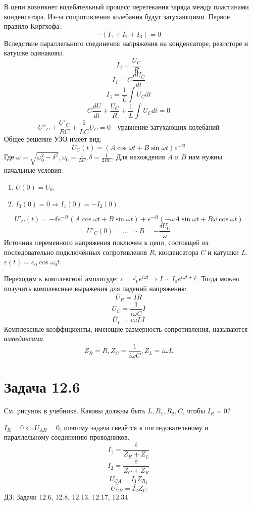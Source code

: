 \documentclass[11pt]{article}
\begin{document}
В цепи возникнет колебательный процесс перетекания заряда между пластинами конденсатора. Из-за сопротивления
колебания будут затухающими.
Первое правило Киргхофа:
$$-(I_1 + I_2 + I_3) = 0$$
Вследствие параллельного соединения напряжения на конденсаторе, резисторе и катушке одинаковы.
$$I_2 = \frac{U_C}R$$
$$I_1 = C\frac{dU_C}{dt}$$
$$I_3 = \frac{1}L\int U_Cdt$$
$$C\frac{dU}{dt} + \frac{U_C}R + \frac{1}L\int U_Cdt = 0$$
$$U''_C + \frac{U'_C}{RC} + \frac{1}{LC}U_C = 0 \text{ - уравнение затухающих колебаний}$$
Общее решение УЗО имеет вид:
$$U_C(t) = (A\cos \omega t + B\sin \omega t)e^{-\delta t}$$
Где \(\omega = \sqrt{\omega_0^2 - \delta^2}, \omega_0 = \frac{1}{LC}, \delta = \frac{1}{2RC}\).
Для нахождения \(A\) и \(B\) нам нужны начальные условия:
\begin{enumerate}
\item \(U(0) = U_0\).
\item \(I_3(0) = 0 \Rightarrow I_1(0) = -I_2(0)\).
\end{enumerate}
$$U'_C(t) = -\delta e^{-\delta t}(A\cos\omega t + B\sin\omega t) + e^{-\delta t}(-\omega A\sin\omega t + B\omega\cos\omega t)$$
$$U'_C(0) = \ldots \Rightarrow B = -\frac{\delta U_0}\omega$$
Источник переменного напряжения поключен к цепи, состоящей из последовательно подключённых сопротивления \(R\),
конденсатора \(C\) и катушки \(L\). \(\varepsilon(t) = \varepsilon_0\cos\omega_0 t\).

Переходим к комплексной амплитуде: \(\varepsilon = \overline{\varepsilon_0}e^{i\omega t} \Rightarrow I \sim \overline I_0e^{i\omega t + \varphi}\).
Тогда можно получить комплексные выражения для падений напряжения:
$$\overline U_R = \overline IR$$
$$\overline U_C = \frac{1}{i\omega C}\overline I$$
$$\overline U_L = i\omega L\overline I$$
Комплексные коэффициенты, имеющие размерность сопротивления, называются \textit{импедансами}.
$$Z_R = R, Z_C = \frac{1}{i\omega C}, Z_L = i\omega L$$
\section{Задача 12.6}
\label{sec:org994700e}
См. рисунок в учебнике. Каковы должны быть \(L, R_1, R_2, C\), чтобы \(I_R = 0\)?

\(I_R = 0 \Leftrightarrow U_{AB} = 0\), поэтому задача сведётся к последовательному и параллельному соединению проводников.
$$\overline{I_1} = \frac{\overline\varepsilon}{Z_R + Z_L}$$
$$\overline{I_2} = \frac{\overline\varepsilon}{Z_C + Z_R}$$
$$\overline{U_{CA}} = \overline{I_1}Z_{R_2}$$
$$\overline{U_{CB}} = \overline{I_2}Z_C$$
ДЗ: Задачи 12.6, 12.8, 12.13, 12.17, 12.34
\end{document}
